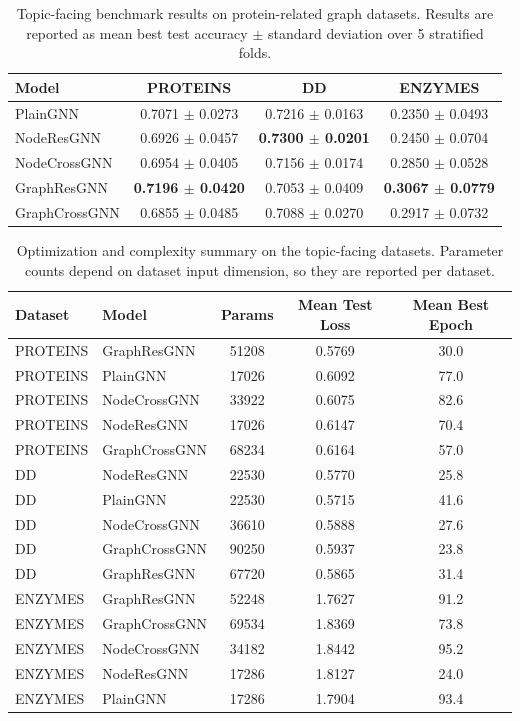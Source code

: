 \begin{table}[t]
\centering
\small
\caption{Topic-facing benchmark results on protein-related graph datasets. Results are reported as mean best test accuracy $\pm$ standard deviation over 5 stratified folds.}
\label{tab:topic_main_results}
\begin{tabular}{lccc}
\toprule
Model & PROTEINS & DD & ENZYMES \\
\midrule
PlainGNN & 0.7071 $\pm$ 0.0273 & 0.7216 $\pm$ 0.0163 & 0.2350 $\pm$ 0.0493 \\
NodeResGNN & 0.6926 $\pm$ 0.0457 & \textbf{0.7300 $\pm$ 0.0201} & 0.2450 $\pm$ 0.0704 \\
NodeCrossGNN & 0.6954 $\pm$ 0.0405 & 0.7156 $\pm$ 0.0174 & 0.2850 $\pm$ 0.0528 \\
GraphResGNN & \textbf{0.7196 $\pm$ 0.0420} & 0.7053 $\pm$ 0.0409 & \textbf{0.3067 $\pm$ 0.0779} \\
GraphCrossGNN & 0.6855 $\pm$ 0.0485 & 0.7088 $\pm$ 0.0270 & 0.2917 $\pm$ 0.0732 \\
\bottomrule
\end{tabular}
\end{table}

\begin{table}[t]
\centering
\small
\caption{Optimization and complexity summary on the topic-facing datasets. Parameter counts depend on dataset input dimension, so they are reported per dataset.}
\label{tab:topic_aux_results}
\begin{tabular}{llccc}
\toprule
Dataset & Model & Params & Mean Test Loss & Mean Best Epoch \\
\midrule
PROTEINS & GraphResGNN & 51208 & 0.5769 & 30.0 \\
PROTEINS & PlainGNN & 17026 & 0.6092 & 77.0 \\
PROTEINS & NodeCrossGNN & 33922 & 0.6075 & 82.6 \\
PROTEINS & NodeResGNN & 17026 & 0.6147 & 70.4 \\
PROTEINS & GraphCrossGNN & 68234 & 0.6164 & 57.0 \\
\midrule
DD & NodeResGNN & 22530 & 0.5770 & 25.8 \\
DD & PlainGNN & 22530 & 0.5715 & 41.6 \\
DD & NodeCrossGNN & 36610 & 0.5888 & 27.6 \\
DD & GraphCrossGNN & 90250 & 0.5937 & 23.8 \\
DD & GraphResGNN & 67720 & 0.5865 & 31.4 \\
\midrule
ENZYMES & GraphResGNN & 52248 & 1.7627 & 91.2 \\
ENZYMES & GraphCrossGNN & 69534 & 1.8369 & 73.8 \\
ENZYMES & NodeCrossGNN & 34182 & 1.8442 & 95.2 \\
ENZYMES & NodeResGNN & 17286 & 1.8127 & 24.0 \\
ENZYMES & PlainGNN & 17286 & 1.7904 & 93.4 \\
\bottomrule
\end{tabular}
\end{table}
